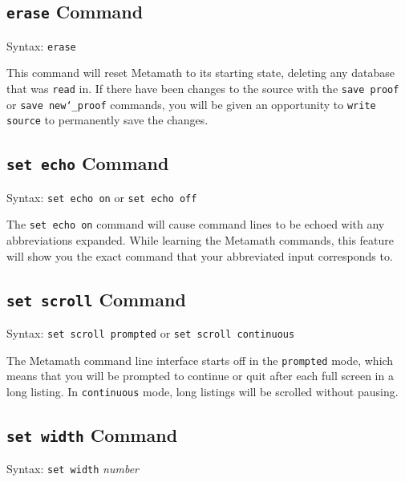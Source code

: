 \subsection{\texttt{erase} Command}
Syntax:  \texttt{erase}

This command will reset Metamath to its starting state, deleting any
data\-base that was \texttt{read} in.
 If there have been changes to the
source with the \texttt{save proof} or \texttt{save new{\char`\_}proof}
commands, you will be given an opportunity to \texttt{write source} to
permanently save the changes.



\subsection{\texttt{set echo} Command}
Syntax:  \texttt{set echo on} or \texttt{set echo off}

The \texttt{set echo on} command will cause command lines to be echoed with any
abbreviations expanded.  While learning the Metamath commands, this
feature will show you the exact command that your abbreviated input
corresponds to.



\subsection{\texttt{set scroll} Command}
Syntax:  \texttt{set scroll prompted} or \texttt{set scroll continuous}

The Metamath command line interface starts off in the \texttt{prompted} mode,
which means that you will be prompted to continue or quit after each
full screen in a long listing.  In \texttt{continuous} mode, long listings will be
scrolled without pausing.

\subsection{\texttt{set width} Command}
Syntax:  \texttt{set width} {\em number}

